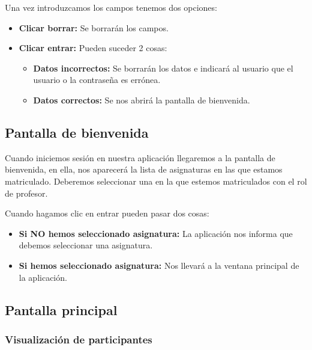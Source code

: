 Una vez introduzcamos los campos tenemos dos opciones:

\begin{itemize}
	\tightlist
	\item
	\textbf{Clicar borrar:} Se borrarán los campos.
	\item
	\textbf{Clicar entrar:} Pueden suceder 2 cosas:
	\begin{itemize}
		\tightlist
		\item
		\textbf{Datos incorrectos:} Se borrarán los datos e indicará al usuario que el usuario o la contraseña es errónea.
		\item
		\textbf{Datos correctos:} Se nos abrirá la pantalla de bienvenida.
	\end{itemize}
\end{itemize}

\subsection{Pantalla de bienvenida}


Cuando iniciemos sesión en nuestra aplicación llegaremos a la pantalla de bienvenida, en ella, nos aparecerá la lista de asignaturas en las que estamos matriculado. Deberemos seleccionar una en la que estemos matriculados con el rol de profesor.


Cuando hagamos clic en entrar pueden pasar dos cosas:

\begin{itemize}
	\tightlist
	\item
	\textbf{Si NO hemos seleccionado asignatura:} La aplicación nos informa que debemos seleccionar una asignatura.
	\item
	\textbf{Si hemos seleccionado asignatura:} Nos llevará a la ventana principal de la aplicación.
	
\end{itemize}

\subsection{Pantalla principal}


\subsubsection{Visualización de participantes}

